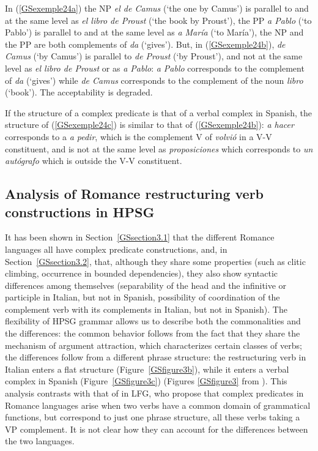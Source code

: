 \documentclass[output=paper
	        ,collection
	        ,collectionchapter
 	        ,biblatex
                ,babelshorthands
                ,newtxmath
                ,draftmode
                ,colorlinks, citecolor=brown
]{langscibook}
\begin{document}
{In (\ref{GSexemple24a}) the NP \emph{el de Camus} (`the one by Camus') is parallel to and at the same level as \emph{el libro de Proust} (`the book by Proust'), the PP \emph{a Pablo} (`to Pablo') is parallel to and at the same level as \emph{a Mar\'ia} (`to Mar\'ia'), the NP and the PP are both complements of \emph{da} (`gives'). But, in (\ref{GSexemple24b}), \emph{de Camus} (`by Camus') is parallel to \emph{de Proust} (`by Proust'), and not at the same level as \emph{el libro de Proust} or as \emph{a Pablo}: \emph{a Pablo} corresponds to the complement of \emph{da} (`gives') while \emph{de Camus} corresponds to the complement of the noun \emph{libro} (`book'). The acceptability is degraded. 

If the structure of a complex predicate is that of a verbal complex in Spanish, the structure of (\ref{GSexemple24c}) is similar to that of (\ref{GSexemple24b}): \emph{a hacer} corresponds to a \emph{a pedir}, which is the complement V of \emph{volvi\'o} in a V-V constituent, and is not at the same level as \emph{proposiciones} which corresponds to \emph{un aut\'ografo} which is outside the V-V constituent.   

\subsection{Analysis of Romance restructuring verb constructions in HPSG} \label{GSsection3.3}
\label{sec-romance-complex-predicates}

It has been shown in Section~\ref{GSsection3.1} that the different Romance languages all have complex predicate constructions, and, in Section~\ref{GSsection3.2}, that, although they share some properties (such as clitic climbing, occurrence in bounded dependencies), they also show syntactic differences among themselves (separability of the head and the infinitive or participle in Italian, but not in Spanish, possibility of coordination of the complement verb with its complements in Italian, but not in Spanish). The flexibility of HPSG grammar allows us to describe both the commonalities and the differences: the common behavior follows from the fact that they share the mechanism of argument attraction, which characterizes certain classes of verbs; the differences follow from a different phrase structure: the restructuring verb in Italian enters a flat structure (Figure~\ref{GSfigure3b}), while it enters a verbal complex in Spanish (Figure~\ref{GSfigure3c}) (Figures  \ref{GSfigure3} from \citealt[146]{AG2010}). This analysis contrasts with that of \cite{andrews1999complex} in LFG, who propose that complex predicates in Romance languages arise when two verbs have a common domain of grammatical functions, but correspond to just one phrase structure, all these verbs taking a VP complement. It is not clear how they can account for the differences between the two languages.

}
\end{document}
